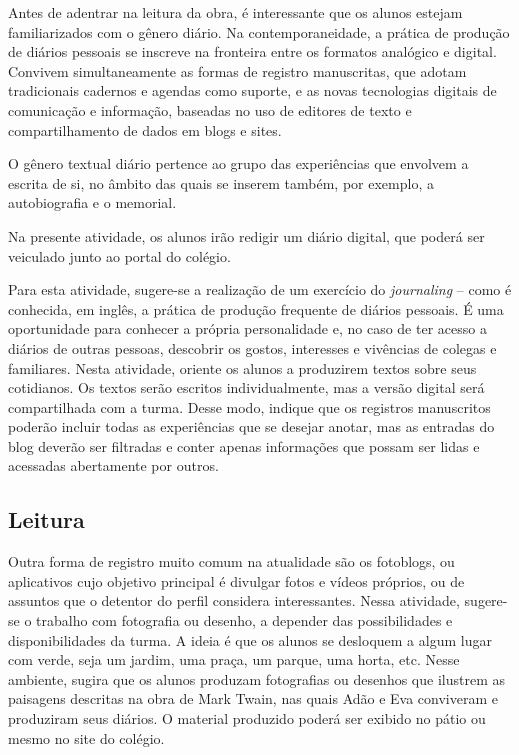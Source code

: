 \documentclass{extarticle}
\begin{document}
Antes de adentrar na leitura da obra, é interessante que os
alunos estejam familiarizados com o gênero diário. Na contemporaneidade,
a prática de produção de diários pessoais se inscreve na fronteira entre
os formatos analógico e digital. Convivem simultaneamente as formas de
registro manuscritas, que adotam tradicionais cadernos e agendas como
suporte, e as novas tecnologias digitais de comunicação e informação,
baseadas no uso de editores de texto e compartilhamento de dados em
blogs e sites.

O gênero textual diário pertence ao grupo das experiências que envolvem
a escrita de si, no âmbito das quais se inserem também, por exemplo, a
autobiografia e o memorial.

Na presente atividade, os alunos irão redigir um diário digital, que
poderá ser veiculado junto ao portal do colégio.

Para esta atividade, sugere-se a realização de um exercício do
\emph{journaling} -- como é conhecida, em inglês, a prática de produção
frequente de diários pessoais. É uma oportunidade para conhecer a
própria personalidade e, no caso de ter acesso a diários de outras
pessoas, descobrir os gostos, interesses e vivências de colegas e
familiares. Nesta atividade, oriente os alunos a produzirem textos sobre
seus cotidianos. Os textos serão escritos individualmente, mas a versão
digital será compartilhada com a turma. Desse modo, indique que os
registros manuscritos poderão incluir todas as experiências que se
desejar anotar, mas as entradas do blog deverão ser filtradas e conter
apenas informações que possam ser lidas e acessadas abertamente por
outros.

\subsection{Leitura}


Outra forma de registro muito comum na atualidade são os
fotoblogs, ou aplicativos cujo objetivo principal é divulgar fotos e
vídeos próprios, ou de assuntos que o detentor do perfil considera
interessantes. Nessa atividade, sugere-se o trabalho com fotografia ou
desenho, a depender das possibilidades e disponibilidades da turma. A
ideia é que os alunos se desloquem a algum lugar com verde, seja um
jardim, uma praça, um parque, uma horta, etc. Nesse ambiente, sugira que
os alunos produzam fotografias ou desenhos que ilustrem as paisagens
descritas na obra de Mark Twain, nas quais Adão e Eva conviveram e
produziram seus diários. O material produzido poderá ser exibido no
pátio ou mesmo no site do colégio.
\end{document}
